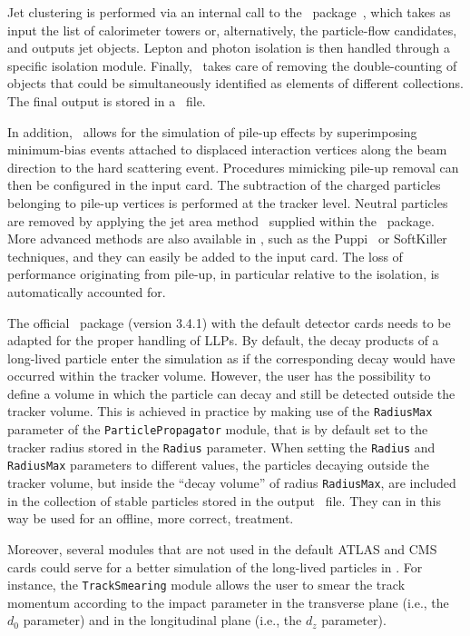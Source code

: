 Jet clustering is performed via an internal call to the \FJ\
package~\cite{Cacciari:2011ma}, which takes as input the
list of calorimeter towers or, alternatively, the particle-flow candidates, and
outputs jet objects. Lepton and photon isolation is then handled through a
specific isolation module. Finally, \DEL\ takes care of removing the
double-counting of objects that could be simultaneously identified as elements of
different collections. The final output is stored in a \ROOT\ file.

In addition, \DEL\ allows for the simulation of pile-up effects by
superimposing minimum-bias events attached to displaced interaction vertices
along the beam direction
to the hard scattering event. Procedures mimicking pile-up
removal can then be configured in the input card. The subtraction of the charged
particles belonging to pile-up vertices is performed at the tracker level.
Neutral particles are removed by applying the jet area
method~\cite{Cacciari:2007fd} supplied within the \FJ\ package. More advanced methods are also available in \DEL, such as the
{\sc Puppi}~\cite{Bertolini:2014bba} or {\sc SoftKiller}~\cite{Cacciari:2014gra}
techniques, and they can easily be added to the input card. The loss of
performance originating from pile-up, in particular relative to the isolation, is
automatically accounted for.

The official \DEL\ package (version 3.4.1) with the default detector cards needs
to be adapted for the proper handling of LLPs.
By default, the decay products of a long-lived particle enter the
simulation as if the corresponding decay would have occurred within the
tracker volume. However, the user has the possibility to define a volume in
which the particle can decay and still be detected outside the tracker volume. This is achieved in
practice by making use of the \verb+RadiusMax+ parameter of the
\verb+ParticlePropagator+ module, that is by default set to the tracker radius
stored in the \verb+Radius+ parameter. When setting the \verb+Radius+ and
\verb+RadiusMax+ parameters to different values, the particles decaying outside
the tracker volume, but inside the ``decay volume'' of radius \verb+RadiusMax+, are
included in the collection of stable particles stored in the output \ROOT\ file.
They can in this way be used for an offline, more correct, treatment.

Moreover, several modules that are not used in the default ATLAS and CMS cards
could serve for a better simulation of the long-lived particles in \DEL . For
instance, the \verb+TrackSmearing+ module allows the user to smear the track momentum
according to the impact parameter in the transverse plane (i.e., the $d_0$
parameter) and in the longitudinal plane (i.e., the $d_z$ parameter).

